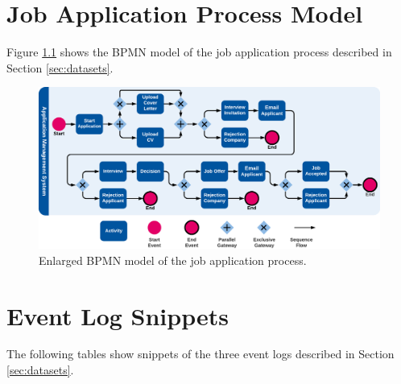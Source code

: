 \begin{appendices}
	

\chapter{Job Application Process Model}\label{appendix-a}

Figure \ref{fig:/application-process-large} shows the BPMN model of the job application process described in Section \ref{sec:datasets}.

\begin{figure}[htbp!]
	\centering
	\includegraphics[width=0.97\textheight, angle=90]{figures/application-process-large}
	\caption[Enlarged BPMN model of the job application process]{Enlarged BPMN model of the job application process.}
	\label{fig:/application-process-large}
\end{figure}

\chapter{Event Log Snippets}\label{appendix-b}

The following tables show snippets of the three event logs described in Section \ref{sec:datasets}.



\end{appendices}
